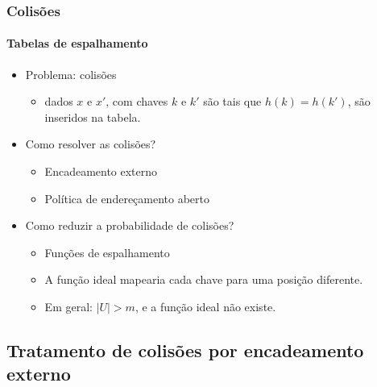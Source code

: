 \documentclass{beamer}
\begin{document}
\begin{frame}

  \frametitle{Colisões}
  \framesubtitle{Tabelas de espalhamento}

  \begin{itemize}

    \item Problema: \alert{colisões}

      \begin{itemize}

      \item dados $x$ e $x'$, com chaves $k$ e $k'$ são tais que $h(k) = h(k')$,
         são inseridos na tabela.

      \end{itemize}

    \item Como resolver as colisões?

      \begin{itemize}

        \item Encadeamento externo

        \item Política de endereçamento aberto

      \end{itemize}

    \item Como reduzir a probabilidade de colisões?

      \begin{itemize}

      \item Funções de espalhamento

      \item A função ideal mapearia cada chave para uma posição
        diferente.

      \item Em geral: $| U | > m$, e a função ideal não existe.

      \end{itemize}

  \end{itemize}
      
\end{frame}

\subsection{Tratamento de colisões por encadeamento externo}
\end{document}
